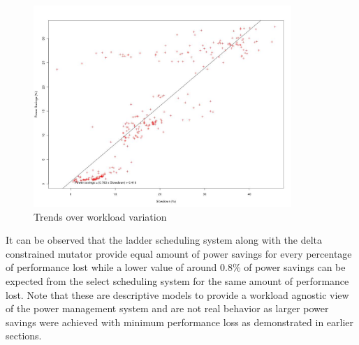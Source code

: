 \begin{figure}[h!]
  \begin{center}
    \includegraphics[height=3.0in]{figures/slowdown_power_select.jpg}
    \caption{Trends over workload variation}
    \label{fig:slowdown_power_select}
  \end{center}
\end{figure}

It can be observed that the ladder scheduling system along with the delta constrained mutator 
provide equal amount of power savings for every percentage of performance lost while a lower 
value of around 0.8\% of power savings can be expected from the select scheduling system for
the same amount of performance lost. Note that these are descriptive models to provide a
workload agnostic view of the power management system and are not real behavior as larger
power savings were achieved with minimum performance loss as demonstrated in earlier sections. 